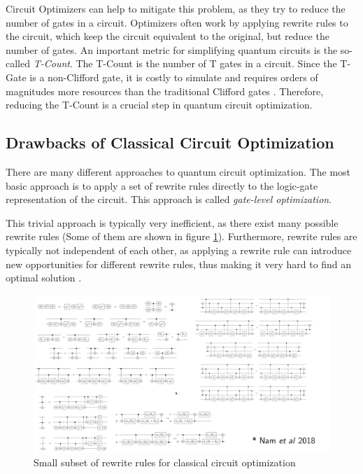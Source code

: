 Circuit Optimizers can help to mitigate this problem, as they try to reduce the number of gates in a circuit. Optimizers often work by applying rewrite rules to the circuit, which keep the circuit equivalent to the original, but reduce the number of gates. An important metric for simplifying quantum circuits is the so-called \textit{T-Count}. The T-Count is the number of T gates in a circuit. Since the T-Gate is a non-Clifford gate, it is costly to simulate and requires orders of magnitudes more resources than the traditional Clifford gates \cite{kissinger2020TCount}. Therefore, reducing the T-Count is a crucial step in quantum circuit optimization.

\subsection{Drawbacks of Classical Circuit Optimization}

There are many different approaches to quantum circuit optimization. The most basic approach is to apply a set of rewrite rules directly to the logic-gate representation of the circuit. This approach is called \textit{gate-level optimization}. \cite{namyross2018automated}

This trivial approach is typically very inefficient, as there exist many possible rewrite rules (Some of them are shown in figure \ref{fig:rewrite_rules_classical}). Furthermore, rewrite rules are typically not independent of each other, as applying a rewrite rule can introduce new opportunities for different rewrite rules, thus making it very hard to find an optimal solution \cite{alexkissinger2020introductionzx}.

\begin{figure}[h]
    \centering
    \includegraphics[width=\linewidth]{images/rewrite_rules_classical.png}
    \caption{Small subset of rewrite rules for classical circuit optimization
            {\cite{alexkissinger2020introductionzx}}}
    \label{fig:rewrite_rules_classical}
\end{figure}


